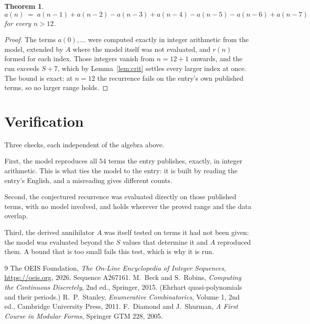 \documentclass[11pt,a4paper]{article}
\theoremstyle{plain}
\newtheorem{theorem}{Theorem}
\theoremstyle{definition}
\begin{document}
\begin{theorem}
\[
a(n)\;=\;a(n-1) + a(n-2) - a(n-3) + a(n-4) - a(n-5) - a(n-6) + a(n-7)
\]
for every $n>12$.
\end{theorem}

\begin{proof}
The terms $a(0),\dots$ were computed exactly in integer arithmetic from the model, extended by
$A$ where the model itself was not evaluated, and $r(n)$ formed for each index. Those integers
vanish from $n=12+1$ onwards, and the run exceeds $S+7$, which by
Lemma~\ref{lem:crit} settles every larger index at once. The bound is exact: at $n=12$ the recurrence fails on the entry's own published terms, so no larger range holds.
\end{proof}

\section{Verification}

Three checks, each independent of the algebra above.

First, the model reproduces all $54$ terms the entry publishes, exactly, in integer
arithmetic. This is what ties the model to the entry: it is built by reading the entry's
English, and a misreading gives different counts.

Second, the conjectured recurrence was evaluated directly on those published terms, with no
model involved, and holds wherever the proved range and the data overlap.

Third, the derived annihilator $A$ was itself tested on terms it had not been given: the model
was evaluated beyond the $S$ values that determine it and $A$ reproduced them. A bound that is
too small fails this test, which is why it is run.

\begin{thebibliography}{9}
 The OEIS Foundation, \emph{The On-Line Encyclopedia of Integer
Sequences}, \url{https://oeis.org}, 2026. Sequence A267161.
 M.~Beck and S.~Robins, \emph{Computing the Continuous Discretely},
2nd ed., Springer, 2015. (Ehrhart quasi-polynomials and their periods.)
 R.~P.~Stanley, \emph{Enumerative Combinatorics}, Volume 1, 2nd ed.,
Cambridge University Press, 2011.
 F.~Diamond and J.~Shurman, \emph{A First Course in Modular Forms},
Springer GTM 228, 2005.
\end{thebibliography}
\end{document}
